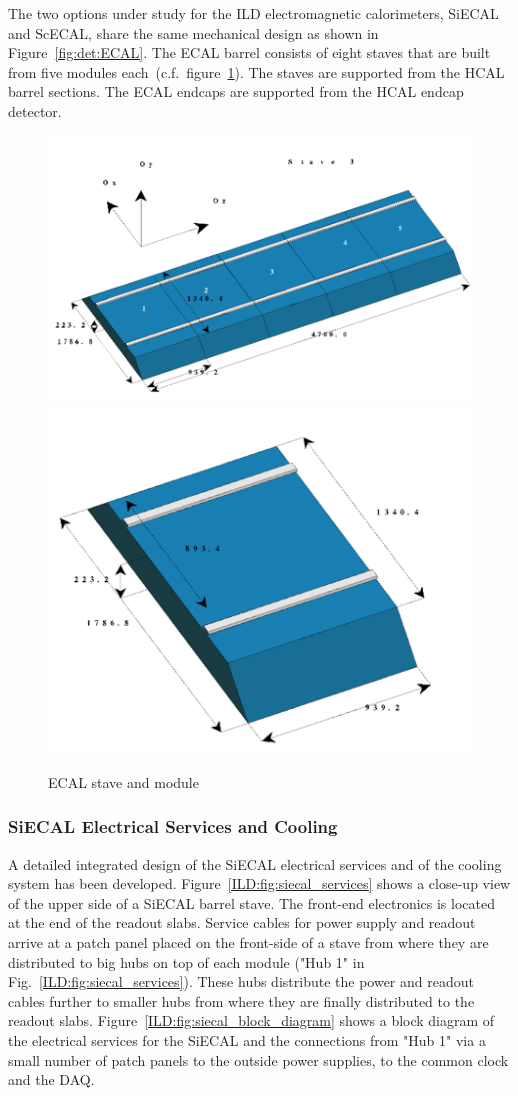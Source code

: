 The two options under study for the ILD electromagnetic calorimeters, SiECAL and ScECAL, share the same mechanical design as shown in Figure~\ref{fig:det:ECAL}. The ECAL barrel consists of eight staves that are built from five modules each~(c.f.~figure~\ref{ILD:fig:ECAL_Mechanics}). The staves are supported from the HCAL barrel sections. The ECAL endcaps are supported from the HCAL endcap detector.
\begin{figure}[h]
    \centering
        \includegraphics[width=0.5\hsize]{Integration/fig/ECAL_Stave.png}
        \includegraphics[width=0.3\hsize]{Integration/fig/ECAL_Module.png}
    \caption{ECAL stave and module~\cite{ild:bib:SiECAL_ICD}}
    \label{ILD:fig:ECAL_Mechanics}
\end{figure}

\subsubsection{SiECAL Electrical Services and Cooling}

A detailed integrated design of the SiECAL electrical services and of the cooling system has been developed. Figure~\ref{ILD:fig:siecal_services} shows a close-up view of the upper side of a SiECAL barrel stave. The front-end electronics is located at the end of the readout slabs. 
Service cables for power supply and readout arrive at a patch panel placed on the front-side of a stave from where they are distributed to big hubs on top of each module ("Hub 1" in Fig.~\ref{ILD:fig:siecal_services}). These hubs distribute the power and readout cables further to smaller hubs from where they are finally distributed to the readout slabs. Figure~\ref{ILD:fig:siecal_block_diagram} shows a block diagram of the electrical services for the SiECAL and the connections from "Hub 1" via a small number of patch panels to the outside power supplies, to the common clock and the DAQ. 

